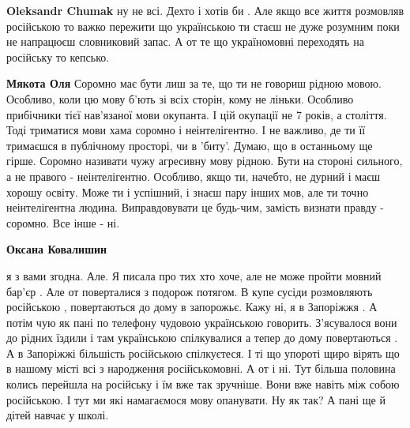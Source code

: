 \begin{itemize}
\begin{itemize}
 
\textbf{Oleksandr Chumak} ну не всі. Дехто і хотів би . Але якщо все життя
розмовляв російською то важко пережити що українською ти стаєш не дуже розумним
поки не напрацюєш словниковий запас. А от те що україномовні переходять на
російську то кепсько.

 
\textbf{Мякота Оля} Соромно має бути лиш за те, що ти не говориш рідною мовою. Особливо, коли цю мову б'ють зі всіх сторін, кому не ліньки. Особливо прибічники тієї нав'язаної мови окупанта. І цій окупації не 7 років, а століття. Тоді триматися мови хама соромно і неінтелігентно. І не важливо, де ти її тримаєшся в публічному просторі, чи в 'биту'. Думаю, що в останньому ще гірше. Соромно називати чужу агресивну мову рідною. Бути на стороні сильного, а не правого - неінтелігентно. Особливо, якщо ти, начебто, не дурний і маєш хорошу освіту. Може ти і успішний, і знаєш пару інших мов, але ти точно неінтелігентна людина. Виправдовувати це будь-чим, замість визнати правду - соромно. Все інше - ні.

 
\textbf{Оксана Ковалишин} 

я з вами згодна. Але. Я писала про тих хто хоче, але не може пройти мовний
бар'єр . Але от поверталися з подорож потягом. В купе сусіди розмовляють
російською , повертаються до дому в запорожьє. Кажу ні, я в Запоріжжя . А потім
чую як пані по телефону чудовою українською говорить. З'ясувалося вони до
рідних їздили і там українською спілкувалися а тепер до дому повертаються . А в
Запоріжжі більшість російською спілкуєтеся. І ті що упороті щиро вірять що в
нашому місті всі з народження російськомовні. А от і ні. Тут більша половина
колись перейшла на російську і їм вже так зручніше. Вони вже навіть між собою
російською. І тут ми які намагаємося мову опанувати. Ну як так? А пані ще й
дітей навчає у школі.


\end{itemize}
\end{itemize}
